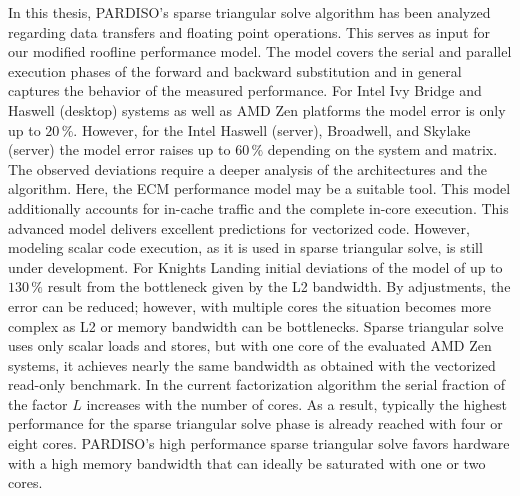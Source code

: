 In this thesis, PARDISO's sparse triangular solve algorithm has been analyzed regarding data transfers and floating point operations. This serves as input for our modified roofline performance model. The model covers the serial and parallel execution phases of the forward and backward substitution and in general captures the behavior of the measured
performance. For Intel Ivy Bridge and Haswell (desktop) systems as well as AMD Zen platforms the model error is only up to $20\,\%$. However, for the Intel Haswell (server), Broadwell, and Skylake (server) the model error raises up to $60\,\%$ depending on the system and matrix. The observed deviations require a deeper analysis
of the architectures and the algorithm. Here, the ECM performance
model may be a suitable tool. This model additionally accounts for in-cache traffic and the complete in-core execution. This advanced model delivers excellent predictions for vectorized code. However, modeling scalar code execution, as it is used in sparse triangular solve, is still under development. For Knights Landing initial deviations of the model
of up to $130\,\%$ result from the bottleneck given by the L2 bandwidth.
By adjustments, the error can be reduced; however, with multiple cores the situation becomes more complex as L2 or memory bandwidth can be bottlenecks. Sparse triangular solve uses only scalar loads and stores, but with one core of the evaluated AMD Zen systems, it achieves nearly the same bandwidth as obtained with the vectorized read-only benchmark. In the current factorization algorithm the serial fraction of the factor $L$
increases with the number of cores. As a result, typically the highest performance for the sparse triangular solve phase is already reached with four or eight cores.
PARDISO's high performance sparse triangular solve favors hardware with a high
memory bandwidth that can ideally be saturated with one or two cores.
